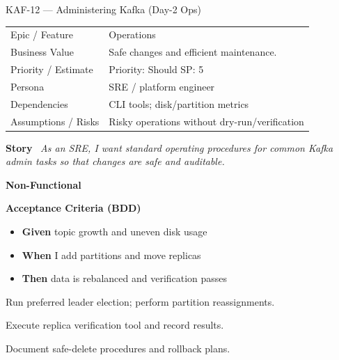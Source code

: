\documentclass[11pt,a4paper]{article}
\newcommand{\Field}[2]{\textbf{#1}~#2}
\begin{document}
\begin{StoryCardBox}{KAF-12 --- Administering Kafka (Day-2 Ops)}
\begin{tabularx}{\linewidth}{LY}
 Epic / Feature & Operations \\
 Business Value & Safe changes and efficient maintenance. \\
 Priority / Estimate & Priority: Should \quad SP: 5 \\
 Persona & SRE / platform engineer \\
 Dependencies & CLI tools; disk/partition metrics \\
 Assumptions / Risks & Risky operations without dry-run/verification \\
\end{tabularx}

\medskip
\Field{Story}{\; \emph{As an SRE, I want standard operating procedures for common Kafka admin tasks so that changes are safe and auditable.}}

\medskip
\Field{Non-Functional}{\; }

\medskip
\Field{Acceptance Criteria (BDD)}{}
\begin{itemize}[leftmargin=1.2em, itemsep=1pt]
  \item \textbf{Given} topic growth and uneven disk usage
  \item \textbf{When} I add partitions and move replicas
  \item \textbf{Then} data is rebalanced and verification passes
\end{itemize}

\begin{TasksBox}
\begin{tasklist}
  \item Run preferred leader election; perform partition reassignments.
  \item Execute replica verification tool and record results.
  \item Document safe-delete procedures and rollback plans.
\end{tasklist}
\end{TasksBox}
\end{StoryCardBox}
\clearpage
\end{document}
